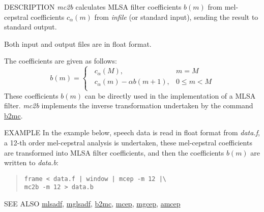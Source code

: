 \begin{synopsis}
 \item [mc2b] [ --a $A$ ] [ --m $M$ ] [ {\em infile} ]
\end{synopsis}

\begin{qsection}{DESCRIPTION}
{\em mc2b} calculates MLSA filter coefficients $b(m)$ 
from mel-cepstral coefficients $c_\alpha(m)$ 
from {\em infile} (or standard input), 
sending the result to standard output.

Both input and output files are in float format.

The coefficients are given as follows:
\begin{displaymath}
b(m) = \begin{cases}
	  \;\; c_\alpha(M), & m=M \\
	  \;\; c_\alpha(m) - \alpha b(m+1), & 0 \leq m < M \\
	\end{cases}
\end{displaymath}
These coefficients $b(m)$ can be directly used in the
implementation of a MLSA filter.
{\em mc2b} implements the inverse transformation undertaken
by the command \hyperlink{b2mc}{b2mc}.
\end{qsection}

\begin{options}
\end{options}

\begin{qsection}{EXAMPLE}
In the example below, speech data is read in float format from {\em data.f},
a 12-th order mel-cepstral analysis is undertaken,
these mel-cepstral coefficients are transformed into
MLSA filter coefficients, and then the coefficients $b(m)$
are written to {\em data.b}:
\begin{quote}
 \verb!frame < data.f | window | mcep -m 12 |\ !\\
 \verb!mc2b -m 12 > data.b!
\end{quote} 
\end{qsection}

\begin{qsection}{SEE ALSO}
\hyperlink{mlsadf}{mlsadf},
\hyperlink{mglsadf}{mglsadf},
\hyperlink{b2mc}{b2mc},
\hyperlink{mcep}{mcep},
\hyperlink{mgcep}{mgcep},
\hyperlink{amcep}{amcep}
\end{qsection}
